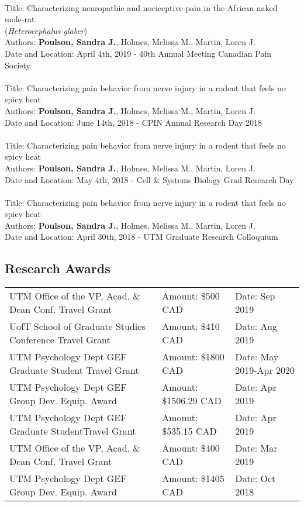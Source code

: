 \documentclass[letterpaper]{article}
\renewenvironment{itemize}{
  \begin{list}{}{
    \setlength{\leftmargin}{1.5em}
  }
}{
  \end{list}
}
\begin{document}
\begin{itemize}
\\
Title: Characterizing neuropathic and nociceptive pain in the African naked mole-rat\\ (\textit{Heterocephalus glaber}) \\
Authors: \textbf {Poulson, Sandra J.}, Holmes, Melissa M., Martin, Loren J. \\
Date and Location: April 4th, 2019 - 40th Annual Meeting Canadian Pain Society \\
\\
Title: Characterizing pain behavior from nerve injury in a rodent that feels no spicy heat \\
Authors: \textbf {Poulson, Sandra J.}, Holmes, Melissa M., Martin, Loren J. \\
Date and Location: June 14th, 2018 - CPIN Annual Research Day 2018 \\
\\
Title: Characterizing pain behavior from nerve injury in a rodent that feels no spicy heat \\
Authors: \textbf {Poulson, Sandra J.}, Holmes, Melissa M., Martin, Loren J. \\
Date and Location: May 4th, 2018 - Cell \& Systems Biology Grad Research Day \\
\\
Title: Characterizing pain behavior from nerve injury in a rodent that feels no spicy heat \\
Authors: \textbf {Poulson, Sandra J.}, Holmes, Melissa M., Martin, Loren J. \\
Date and Location: April 30th, 2018 - UTM Graduate Research Colloquium \\

\end{itemize}

\subsection*{Research Awards}
\begin{tabular}{lll}
UTM Office of the VP, Acad. \& Dean Conf. Travel Grant	& Amount: \$500 CAD & Date: Sep 2019 \\
UofT School of Graduate Studies Conference Travel Grant	& Amount: \$410 CAD & Date: Aug 2019 \\
UTM Psychology Dept GEF Graduate Student Travel Grant & Amount: \$1800 CAD & Date: May 2019-Apr 2020 \\
UTM Psychology Dept GEF Group Dev. Equip. Award	& Amount: \$1506.29 CAD & Date: Apr 2019 \\
UTM Psychology Dept GEF Graduate StudentTravel Grant	& Amount: \$535.15 CAD & Date: Apr 2019 \\
UTM Office of the VP, Acad. \& Dean Conf. Travel Grant	& Amount: \$400 CAD & Date: Mar 2019 \\
UTM Psychology Dept GEF Group Dev. Equip. Award	& Amount: \$1405 CAD	& Date: Oct 2018 \\

\end{tabular}
\end{document}
